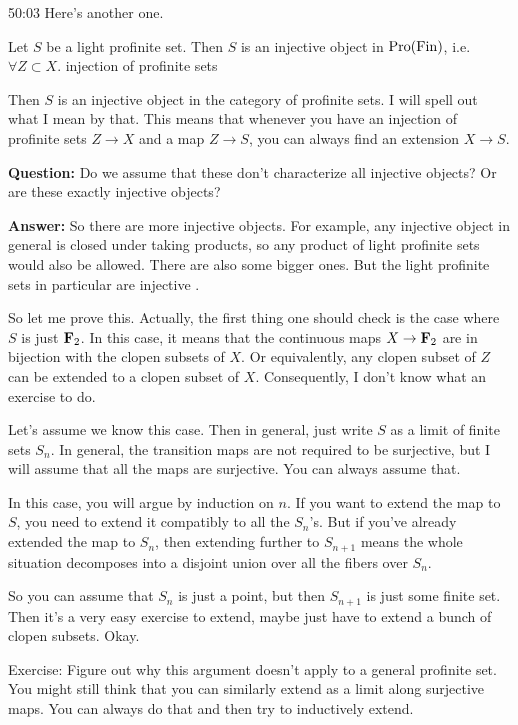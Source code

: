 \begin{unfinished}{50:03}
Here's another one. 

\begin{proposition}
Let $S$ be a light profinite set. Then $S$ is an injective object in $\operatorname{Pro}(\operatorname{Fin})$, i.e. $\forall Z \subset X$. injection of profinite sets 
\end{proposition}

Then $S$ is an injective object in the category of profinite sets. I will spell out what I mean by that. This means that whenever you have an injection of profinite sets $Z \to X$ and a map $Z \to S$, you can always find an extension $X \to S$.

\textbf{Question:} Do we assume that these don't characterize all injective objects? Or are these exactly injective objects? 


\textbf{Answer:} So there are more injective objects. For example, any injective object in general is closed under taking products, so any product of light profinite sets would also be allowed. There are also some bigger ones. But the light profinite sets in particular are injective .

\begin{sketch}
So let me prove this. 
Actually, the first thing one should check is the case where $S$ is just $\mathbf F_2$. In this case, it means that the continuous maps $X \to \mathbf F_2$ are in bijection with the clopen subsets of $X$. Or equivalently, any clopen subset of $Z$ can be extended to a clopen subset of $X$. Consequently, I don't know what an exercise to do.

Let's assume we know this case. Then in general, just write $S$ as a limit of finite sets $S_n$. In general, the transition maps are not required to be surjective, but I will assume that all the maps are surjective. You can always assume that.

In this case, you will argue by induction on $n$. If you want to extend the map to $S$, you need to extend it compatibly to all the $S_n$'s. But if you've already extended the map to $S_n$, then extending further to $S_{n+1}$ means the whole situation decomposes into a disjoint union over all the fibers over $S_n$.

So you can assume that $S_n$ is just a point, but then $S_{n+1}$ is just some finite set. Then it's a very easy exercise to extend, maybe just have to extend a bunch of clopen subsets. Okay.

\end{sketch}

Exercise: Figure out why this argument doesn't apply to a general profinite set. You might still think that you can similarly extend as a limit along surjective maps. You can always do that and then try to inductively extend.


\end{unfinished}
